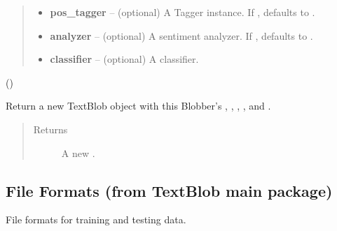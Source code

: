 \documentclass[letterpaper,10pt,english]{sphinxmanual}
\begin{document}
\begin{fulllineitems}
\begin{quote}
\begin{description}
\begin{itemize}
\item {} 
\textbf{pos\_tagger} -- (optional) A Tagger instance. If , defaults to
{\hyperref[api_reference:textblob_de.taggers.PatternTagger]{}}.

\item {} 
\textbf{analyzer} -- (optional) A sentiment analyzer. If , defaults to
{\hyperref[api_reference:textblob_de.sentiments.PatternAnalyzer]{}}.

\item {} 
\textbf{classifier} -- (optional) A classifier.

\end{itemize}

\end{description}\end{quote}

()

\begin{fulllineitems}
\label{api_reference:textblob_de.blob.BlobberDE.__call__}
Return a new TextBlob object with this Blobber's ,
, , , and .
\begin{quote}\begin{description}
\item[{Returns}] \leavevmode
A new .

\end{description}\end{quote}

\end{fulllineitems}


\end{fulllineitems}



\subsection{File Formats (from TextBlob main package)}
\label{api_reference:module-textblob.formats}\label{api_reference:file-formats-from-textblob-main-package}
File formats for training and testing data.
\end{document}
